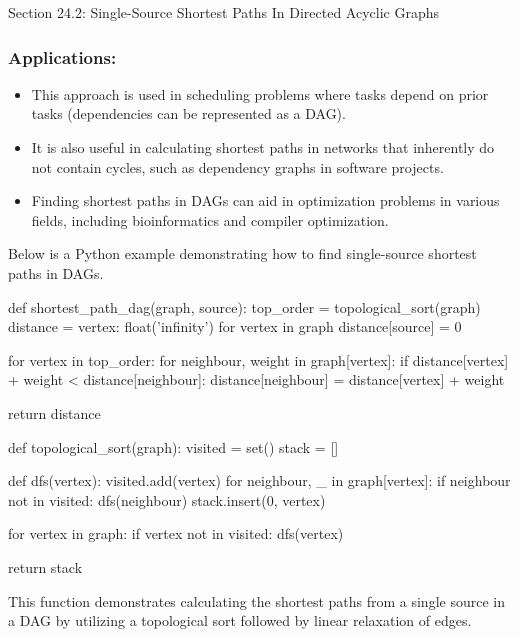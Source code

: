 \begin{notes}{Section 24.2: Single-Source Shortest Paths In Directed Acyclic Graphs}
    \subsubsection*{Applications:}
    
    \begin{itemize}
        \item This approach is used in scheduling problems where tasks depend on prior tasks (dependencies can be represented as a DAG).
        \item It is also useful in calculating shortest paths in networks that inherently do not contain cycles, such as dependency graphs in software projects.
        \item Finding shortest paths in DAGs can aid in optimization problems in various fields, including bioinformatics and compiler optimization.
    \end{itemize}
    
    \begin{highlight}
    
    Below is a Python example demonstrating how to find single-source shortest paths in DAGs.
    
    \begin{code}[Python]
    def shortest_path_dag(graph, source):
        top_order = topological_sort(graph)
        distance = {vertex: float('infinity') for vertex in graph}
        distance[source] = 0
    
        for vertex in top_order:
            for neighbour, weight in graph[vertex]:
                if distance[vertex] + weight < distance[neighbour]:
                    distance[neighbour] = distance[vertex] + weight
    
        return distance
    
    def topological_sort(graph):
        visited = set()
        stack = []
    
        def dfs(vertex):
            visited.add(vertex)
            for neighbour, _ in graph[vertex]:
                if neighbour not in visited:
                    dfs(neighbour)
            stack.insert(0, vertex)
    
        for vertex in graph:
            if vertex not in visited:
                dfs(vertex)
    
        return stack
    \end{code}
    This function demonstrates calculating the shortest paths from a single source in a DAG by utilizing a topological sort followed by linear relaxation of edges.
    \end{highlight}    
\end{notes}

